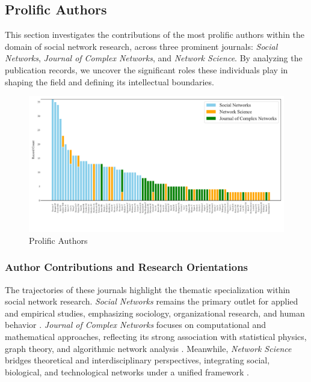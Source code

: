 \documentclass[twocolumn]{article}
\begin{document}
	\subsection{Prolific Authors}\label{Prolific Authors}
	
	This section investigates the contributions of the most prolific authors within the domain of social network research, across three prominent journals: \textit{Social Networks}, \textit{Journal of Complex Networks}, and \textit{Network Science}. By analyzing the publication records, we uncover the significant roles these individuals play in shaping the field and defining its intellectual boundaries.
	
	\begin{figure}[htbp]
		\centering
		\includegraphics[width=\textwidth]{images/Top 30 Authors by Publication Count Across Three Journals.pdf}
		\caption{Prolific Authors}
		\label{fig.fig2}
	\end{figure}
	
	\subsubsection*{Author Contributions and Research Orientations}
	
The trajectories of these journals highlight the thematic specialization within social network research. \textit{Social Networks} remains the primary outlet for applied and empirical studies, emphasizing sociology, organizational research, and human behavior \cite{Marin2011,Freeman2004}. \textit{Journal of Complex Networks} focuses on computational and mathematical approaches, reflecting its strong association with statistical physics, graph theory, and algorithmic network analysis \cite{Newman2010,Fortunato2010}. Meanwhile, \textit{Network Science} bridges theoretical and interdisciplinary perspectives, integrating social, biological, and technological networks under a unified framework \cite{Barabasi2022,Boccaletti2006}.
\end{document}
